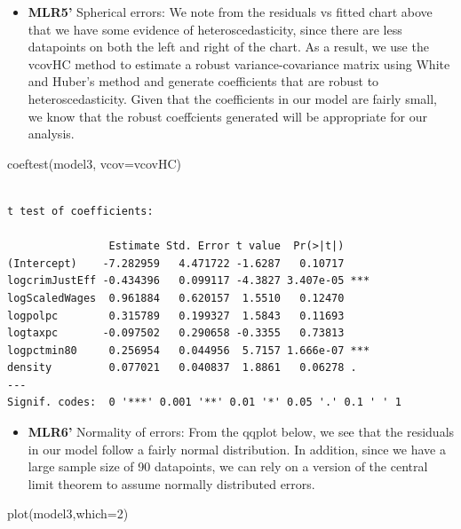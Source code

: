 \documentclass[]{article}
\newenvironment{Shaded}{}{}
\newcommand{\DataTypeTok}[1]{#1}
\newcommand{\DecValTok}[1]{#1}
\newcommand{\KeywordTok}[1]{\textcolor[rgb]{0.00,0.00,1.00}{#1}}
\newcommand{\NormalTok}[1]{#1}
\providecommand{\tightlist}{%
  \setlength{\itemsep}{0pt}\setlength{\parskip}{0pt}}
\begin{document}
\begin{itemize}
\tightlist
\item
  \textbf{MLR5'} Spherical errors: We note from the residuals vs fitted
  chart above that we have some evidence of heteroscedasticity, since
  there are less datapoints on both the left and right of the chart. As
  a result, we use the vcovHC method to estimate a robust
  variance-covariance matrix using White and Huber's method and generate
  coefficients that are robust to heteroscedasticity. Given that the
  coefficients in our model are fairly small, we know that the robust
  coeffcients generated will be appropriate for our analysis.
\end{itemize}

\begin{Shaded}
\begin{Highlighting}[]
\KeywordTok{coeftest}\NormalTok{(model3, }\DataTypeTok{vcov=}\NormalTok{vcovHC)}
\end{Highlighting}
\end{Shaded}

\begin{verbatim}

t test of coefficients:

                Estimate Std. Error t value  Pr(>|t|)    
(Intercept)    -7.282959   4.471722 -1.6287   0.10717    
logcrimJustEff -0.434396   0.099117 -4.3827 3.407e-05 ***
logScaledWages  0.961884   0.620157  1.5510   0.12470    
logpolpc        0.315789   0.199327  1.5843   0.11693    
logtaxpc       -0.097502   0.290658 -0.3355   0.73813    
logpctmin80     0.256954   0.044956  5.7157 1.666e-07 ***
density         0.077021   0.040837  1.8861   0.06278 .  
---
Signif. codes:  0 '***' 0.001 '**' 0.01 '*' 0.05 '.' 0.1 ' ' 1
\end{verbatim}

\begin{itemize}
\tightlist
\item
  \textbf{MLR6'} Normality of errors: From the qqplot below, we see that
  the residuals in our model follow a fairly normal distribution. In
  addition, since we have a large sample size of 90 datapoints, we can
  rely on a version of the central limit theorem to assume normally
  distributed errors.
\end{itemize}

\begin{Shaded}
\begin{Highlighting}[]
\KeywordTok{plot}\NormalTok{(model3,}\DataTypeTok{which=}\DecValTok{2}\NormalTok{)}
\end{Highlighting}
\end{Shaded}
\end{document}
